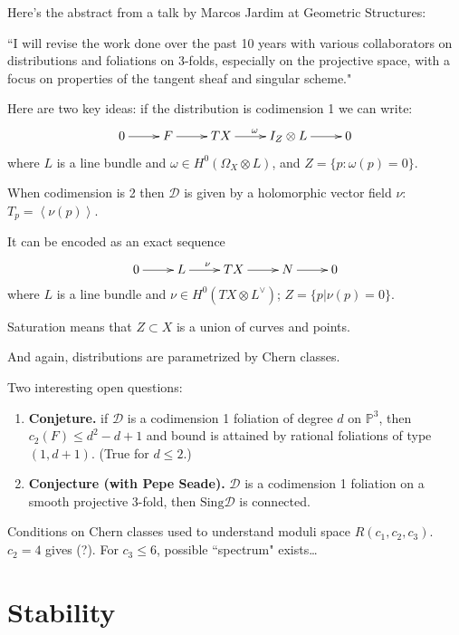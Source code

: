Here's the abstract from a talk by Marcos Jardim at Geometric Structures:

``I will revise the work done over the past 10 years with various collaborators
on distributions and foliations on 3-folds, especially on the projective space,
with a focus on properties of the tangent sheaf and singular scheme."

Here are two key ideas: if the distribution is codimension 1 we can write:
$$
\xymatrix{
0\ar[r]&F\ar[r]&TX\ar[r]^{\omega}&I_Z \otimes L\ar[r]&0
}
$$
where $L$ is a line bundle and $\omega \in H^{0}(\Omega_X \otimes L)$, and
$Z=\{p:\omega(p)=0\}$.

When codimension is 2 then $\mathcal{D}$ is given by a holomorphic vector field 
$\nu$: $T_p=\left<\nu(p)\right>$.

It can be encoded as an exact sequence
$$
\xymatrix{
	0\ar[r]&L\ar[r]^{\nu}&TX\ar[r]&N\ar[r]&0
}
$$
where $L$ is a line bundle and $\nu \in H^{0}(TX \otimes L^\vee)$;
  $Z=\{p | \nu(p) = 0\}$.

\begin{remark}
\label{remark-stauration}
Saturation means that $Z \subset X$ is a union of curves and points.
\end{remark}

And again, distributions are parametrized by Chern classes.

Two interesting open questions:
\begin{enumerate}
\item {\bf Conjeture.} if $\mathcal{D}$ is a codimension 1 foliation of degree
$d$ on $\mathbb{P}^3$, then $c_2(F)\leq d^2-d+1$ and bound is attained
by rational foliations of type $(1,d+1)$. (True for $d \leq 2$.)
\item {\bf Conjecture (with Pepe Seade).} $\mathcal{D}$ is a codimension 1 
foliation on a smooth projective 3-fold, then $\text{Sing}\mathcal{D}$ is connected.
\end{enumerate}

\begin{theorem}
\label{theorem-jardim-muniz}
Conditions on Chern classes used to understand moduli space $R(c_1,c_2,c_3)$.
$c_2=4$ gives (?). For $c_3\leq 6$, possible ``spectrum" exists…
\end{theorem}

\section{Stability}
\label{section-stability}


